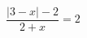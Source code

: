 \begin{ex}[type=equation]
	\begin{condition}
		$\dfrac{\big|3  - x\big| - 2}{2 + x}= 2$
	\end{condition}
	\answer{$\left\{ -1 \right\}$}
\end{ex}